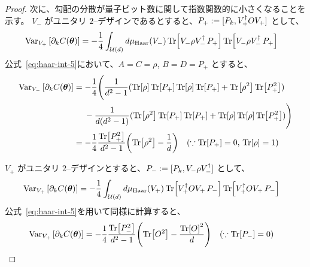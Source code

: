 \begin{proof}
    次に、勾配の分散が量子ビット数に関して指数関数的に小さくなることを示す。
    $V_-$ がユニタリ $2$--デザインであるとすると、$P_+ := [P_k, V_+^\dagger OV_+]$ として、
    \begin{align}
        \operatorname{Var}_{V_+}\qty[\partial_k C(\boldsymbol{\theta})]
        &= -\frac{1}{4}\int_{\mathcal{U}(d)} d\mu_{\mathrm{Haar}}(V_-) \Tr[V_-\rho V_-^\dagger\, P_+]\Tr[V_-\rho V_-^\dagger\, P_+]
    \end{align}
    公式~\eqref{eq:haar-int-5}において、$A = C = \rho$, $B = D = P_+$ とすると、
    \begin{align}
        \operatorname{Var}_{V_-}\qty[\partial_k C(\boldsymbol{\theta})]
        &= -\frac{1}{4}\Bigg(
        \frac{1}{d^2-1}
        (\Tr[\rho]\Tr[P_+]\Tr[\rho]\Tr[P_+] + \Tr[\rho^2]\Tr[P_+^2]) \nonumber\\
        &\quad\;- \frac{1}{d(d^2-1)}
        (\Tr[\rho^2]\Tr[P_+]\Tr[P_+] + \Tr[\rho]\Tr[\rho]\Tr[P_+^2])\Bigg)\\
        &= -\frac{1}{4}\frac{\Tr[P_+^2]}{d^2-1}\qty(\Tr[\rho^2] - \frac{1}{d}) \quad (\because \Tr[P_+] = 0,\, \Tr[\rho] = 1)
    \end{align}
    
    $V_+$ がユニタリ $2$--デザインとすると、$P_- := [P_k, V_-\rho V_-^\dagger]$ として、
    \begin{align}
        \operatorname{Var}_{V_+}\qty[\partial_k C(\boldsymbol{\theta})]
        &= -\frac{1}{4}\int_{\mathcal{U}(d)} d\mu_{\mathrm{Haar}}(V_+) \Tr[V_+^\dagger OV_+\, P_-]\Tr[V_+^\dagger OV_+\, P_-]
    \end{align}
    公式~\eqref{eq:haar-int-5}を用いて同様に計算すると、
    \begin{align}
        \operatorname{Var}_{V_+}\qty[\partial_k C(\boldsymbol{\theta})]
        &= -\frac{1}{4}\frac{\Tr[P_-^2]}{d^2-1}\qty(\Tr[O^2] - \frac{\Tr[O]^2}{d}) \quad (\because \Tr[P_-] = 0)
    \end{align}
    

\end{proof}
